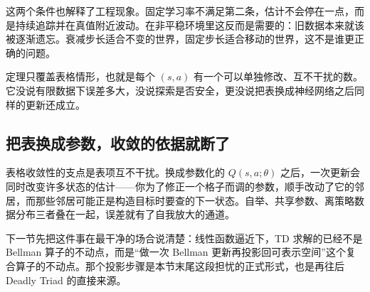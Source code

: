 这两个条件也解释了工程现象。固定学习率不满足第二条，估计不会停在一点，而是持续追踪并在真值附近波动。在非平稳环境里这反而是需要的：旧数据本来就该被逐渐遗忘。衰减步长适合不变的世界，固定步长适合移动的世界，这不是谁更正确的问题。

定理只覆盖表格情形，也就是每个 \((s,a)\) 有一个可以单独修改、互不干扰的数。它没说有限数据下误差多大，没说探索是否安全，更没说把表换成神经网络之后同样的更新还成立。

\subsection{把表换成参数，收敛的依据就断了}

表格收敛性的支点是表项互不干扰。换成参数化的 \(Q(s,a;\theta)\) 之后，一次更新会同时改变许多状态的估计——你为了修正一个格子而调的参数，顺手改动了它的邻居，而那些邻居可能正是构造目标时要查的下一状态。自举、共享参数、离策略数据分布三者叠在一起，误差就有了自我放大的通道。

下一节先把这件事在最干净的场合说清楚：线性函数逼近下，TD 求解的已经不是 Bellman 算子的不动点，而是``做一次 Bellman 更新再投影回可表示空间''这个复合算子的不动点。那个投影步骤是本节末尾这段担忧的正式形式，也是再往后 Deadly Triad 的直接来源。
